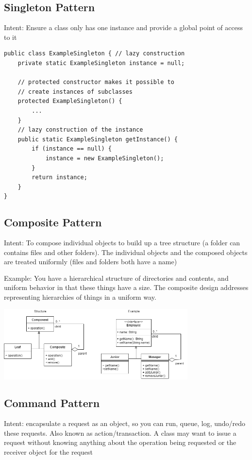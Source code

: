\documentclass[8pt, letterpaper, titlepage]{article}
\begin{document}
\begin{multicols*}{2}
    \subsection*{Singleton Pattern}
    Intent: Ensure a class only has one instance and provide a global point of access to it
    \begin{lstlisting}
public class ExampleSingleton { // lazy construction
    private static ExampleSingleton instance = null;

    // protected constructor makes it possible to
    // create instances of subclasses
    protected ExampleSingleton() {
        ...
    }
    // lazy construction of the instance
    public static ExampleSingleton getInstance() {
        if (instance == null) {
            instance = new ExampleSingleton();
        }
        return instance;
    }
}
    \end{lstlisting}
    \subsection*{Composite Pattern}
    Intent: To compose individual objects to build up a tree structure (a folder can contains files and other folders). The individual objects and the composed objects are treated uniformly (files and folders both have a name)

    Example: You have a hierarchical structure of directories and contents, and uniform behavior in that these things have a size. The composite design addresses representing hierarchies of things in a uniform way.

    \includegraphics[width=10cm]{composite.png}

    \subsection*{Command Pattern}
    Intent: encapsulate a request as an object, so you can run, queue, log, undo/redo these requests. Also known as action/transaction. A class may want to issue a request without knowing anything about the operation being requested or the receiver object for the request


\end{multicols*}
\end{document}
